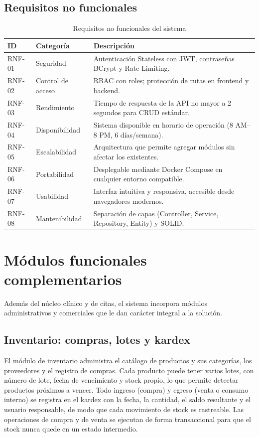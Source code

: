 \documentclass[11pt,a4paper]{report}
\begin{document}
\subsection{Requisitos no funcionales}
\begin{table}[H]
\caption{Requisitos no funcionales del sistema}
\label{tab:rnf}
\begin{tabularx}{\textwidth}{@{}p{1.4cm} p{3.5cm} X@{}}
\toprule
\textbf{ID} & \textbf{Categoría} & \textbf{Descripción} \\
\midrule
RNF-01 & Seguridad & Autenticación Stateless con JWT, contraseñas BCrypt y Rate Limiting. \\
\addlinespace
RNF-02 & Control de acceso & RBAC con roles; protección de rutas en frontend y backend. \\
\addlinespace
RNF-03 & Rendimiento & Tiempo de respuesta de la API no mayor a 2 segundos para CRUD estándar. \\
\addlinespace
RNF-04 & Disponibilidad & Sistema disponible en horario de operación (8 AM--8 PM, 6 días/semana). \\
\addlinespace
RNF-05 & Escalabilidad & Arquitectura que permite agregar módulos sin afectar los existentes. \\
\addlinespace
RNF-06 & Portabilidad & Desplegable mediante Docker Compose en cualquier entorno compatible. \\
\addlinespace
RNF-07 & Usabilidad & Interfaz intuitiva y responsiva, accesible desde navegadores modernos. \\
\addlinespace
RNF-08 & Mantenibilidad & Separación de capas (Controller, Service, Repository, Entity) y SOLID. \\
\bottomrule
\end{tabularx}
\end{table}

\section{Módulos funcionales complementarios}
Además del núcleo clínico y de citas, el sistema incorpora módulos administrativos y comerciales que le dan carácter integral a la solución.

\subsection{Inventario: compras, lotes y kardex}
El módulo de inventario administra el catálogo de productos y sus categorías, los proveedores y el registro de compras. Cada producto puede tener varios lotes, con número de lote, fecha de vencimiento y stock propio, lo que permite detectar productos próximos a vencer. Todo ingreso (compra) y egreso (venta o consumo interno) se registra en el kardex con la fecha, la cantidad, el saldo resultante y el usuario responsable, de modo que cada movimiento de stock es rastreable. Las operaciones de compra y de venta se ejecutan de forma transaccional para que el stock nunca quede en un estado intermedio.
\end{document}
